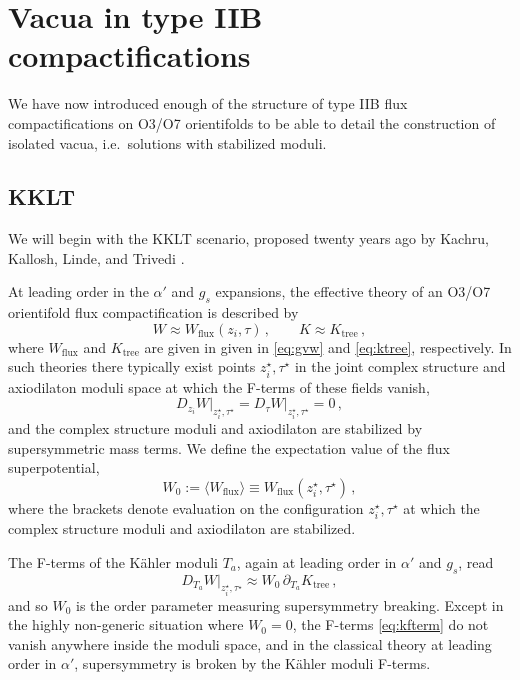 \documentclass[12pt,a4wide]{article}
\begin{document}
\section{Vacua in type IIB compactifications}


We have now introduced enough of the structure of type IIB flux compactifications on O3/O7 orientifolds to be able to detail the construction of isolated vacua, i.e.~solutions with stabilized moduli.

\subsection{KKLT}\label{ss:kklt}

We will begin with the KKLT scenario, proposed twenty years ago by Kachru, Kallosh, Linde, and Trivedi \cite{Kachru:2003aw}.

At leading order in the $\alpha'$ and $g_s$ expansions, the effective theory of an O3/O7 orientifold flux compactification is described by
\begin{equation}
W \approx W_{\text{flux}}(z_i,\tau)\,, \qquad K \approx K_{\text{tree}}\,,
\end{equation}
where $W_{\text{flux}}$  and $K_{\text{tree}}$
are given in given in \eqref{eq:gvw} and \eqref{eq:ktree}, respectively.
In such theories there typically exist points $z_{i}^{\star}, \tau^{\star}$ in the joint complex structure and axiodilaton moduli space at which the F-terms of these fields vanish,
\begin{equation}
D_{z_i}W\bigr|_{z_{i}^{\star}, \tau^{\star}} = D_{\tau} W\bigr|_{z_{i}^{\star}, \tau^{\star}} = 0\,,
\end{equation}
and the complex structure moduli and axiodilaton are stabilized by supersymmetric mass terms.
We define the expectation value of the flux superpotential,
\begin{equation}
    W_0 := \langle W_{\text{flux}} \rangle \equiv W_{\text{flux}}(z_{i}^{\star}, \tau^{\star})\,,
\end{equation}
where the brackets denote evaluation on the configuration $z_{i}^{\star}, \tau^{\star}$ at which the complex structure moduli and axiodilaton are stabilized.

The F-terms of the K\"ahler moduli $T_a$, again at leading order in $\alpha'$ and $g_s$, read
\begin{equation}\label{eq:kfterm}
D_{T_a}W\bigr|_{z_{i}^{\star}, \tau^{\star}} \approx W_{0}\,\partial_{T_a} K_{\text{tree}} \,,
\end{equation}
and so $W_0$ is the order parameter measuring supersymmetry breaking.
Except in the highly non-generic situation where
$W_0=0$,
the F-terms \eqref{eq:kfterm} do not vanish anywhere inside the moduli space, and in the classical theory at leading order in $\alpha'$, supersymmetry is broken by the K\"ahler moduli F-terms. 
\end{document}
